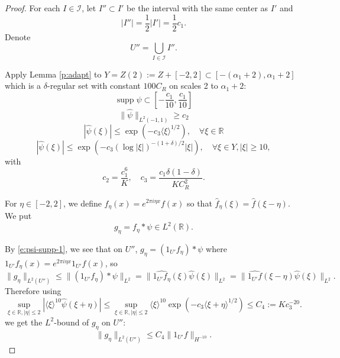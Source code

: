 \documentclass[reqno,12pt,letterpaper]{amsart}
\numberwithin{equation}{section}
\numberwithin{prop}{section}
\DeclareMathOperator{\supp}{supp}
\begin{document}

\begin{proof}
For each $I\in\mathcal{I}$, let $I''\subset I'$ be the interval with the same center as $I'$ and $$|I''|=\frac{1}{2}|I'|=\frac{1}{2}c_1.$$ 
Denote $$U''=\bigcup_{I\in\mathcal{I}}I''.$$

Apply Lemma \ref{p:adapt} to $Y=Z(2):=Z+[-2,2]\subset[-(\alpha_1+2),\alpha_1+2]$ which is a $\delta$-regular set with constant $100C_R$ on scales 2 to $\alpha_1+2$:
\begin{equation}
\label{e:psi-supp-1}
\supp\psi\subset\left[-\frac{c_1}{10},\frac{c_1}{10}\right]
\end{equation}
\begin{equation}
\label{e:psi-lb-1}
\|\widehat{\psi}\|_{L^2(-1,1)}\geq c_2
\end{equation}
\begin{equation}
\label{e:psi-uba}
|\widehat{\psi}(\xi)|\leq\exp(-c_3\langle\xi\rangle^{1/2}),
\quad \forall\xi\in\mathbb{R}
\end{equation}
\begin{equation}
\label{e:psi-uby}
|\widehat{\psi}(\xi)|\leq\exp(-c_3(\log|\xi|)^{-(1+\delta)/2}|\xi|),
\quad \forall\xi\in Y, |\xi|\geq 10,
\end{equation}
with
\begin{equation*}
c_2=\frac{c_1^6}{K},
\quad
c_3=\frac{c_1\delta(1-\delta)}{KC_R^2}.
\end{equation*}

For $\eta\in[-2,2]$, we define $f_\eta(x)=e^{2\pi i\eta x}f(x)$ so that
$\widehat{f}_\eta(\xi)=\widehat{f}(\xi-\eta)$. We put
\begin{equation*}
g_\eta=f_\eta\ast\psi\in L^2(\mathbb{R}).
\end{equation*}

By \eqref{e:psi-supp-1}, we see that on $U''$, $g_\eta=(1_{U'}f_\eta)\ast\psi$
where $1_{U'}f_\eta(x)=e^{2\pi i\eta x}1_{U'}f(x)$, so
\begin{equation*}
\|g_\eta\|_{L^2(U'')}\leq \|(1_{U'}f_\eta)\ast\psi\|_{L^2}
=\|\widehat{1_{U'}f_\eta}(\xi)\widehat{\psi}(\xi)\|_{L^2}
=\|\widehat{1_{U'}f}(\xi-\eta)\widehat{\psi}(\xi)\|_{L^2}.
\end{equation*}
Therefore using
\begin{equation*}
\sup_{\xi\in\mathbb{R},|\eta|\leq2}|
\langle\xi\rangle^{10}\widehat{\psi}(\xi+\eta)|\leq
\sup_{\xi\in\mathbb{R},|\eta|\leq2}\langle\xi\rangle^{10}
\exp(-c_3\langle\xi+\eta\rangle^{1/2})\leq C_4:=Kc_3^{-20}.
\end{equation*}
we get the $L^2$-bound of $g_\eta$ on $U''$:
\begin{equation}
\label{e:g-eta-u}
\|g_\eta\|_{L^2(U'')}\leq C_4\|1_{U'}f\|_{H^{-10}}.
\end{equation}


\end{proof}
\end{document}
